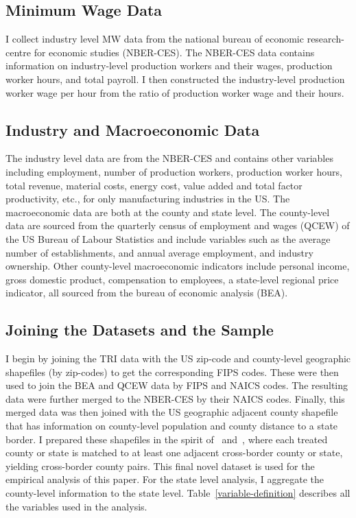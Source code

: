 \documentclass[12pt, english]{article}
\begin{document}
    \subsection{Minimum Wage Data}\label{subsec:minimum-wage-data}
    I collect industry level MW data from the national bureau of economic research-centre for economic studies (NBER-CES). The NBER-CES data contains information on industry-level production workers and their wages, production worker hours, and total payroll. I then constructed the industry-level production worker wage per hour from the ratio of production worker wage and their hours.

    \subsection{Industry and Macroeconomic Data}\label{subsec:industry-and-macroeconomic-data}
    The industry level data are from the NBER-CES and contains other variables including employment, number of production workers, production worker hours, total revenue, material costs, energy cost, value added and total factor productivity, etc., for only manufacturing industries in the US. The macroeconomic data are both at the county and state level. The county-level data are sourced from the quarterly census of employment and wages (QCEW) of the US Bureau of Labour Statistics and include variables such as the average number of establishments, and annual average employment, and industry ownership. Other county-level macroeconomic indicators include personal income, gross domestic product, compensation to employees, a state-level regional price indicator, all sourced from the bureau of economic analysis (BEA).

    \subsection{Joining the Datasets and the Sample}\label{subsec:joining-the-datasets-and-the-sample}
    I begin by joining the TRI data with the US zip-code and county-level geographic shapefiles (by zip-codes) to get the corresponding FIPS codes. These were then used to join the BEA and QCEW data by FIPS and NAICS codes. The resulting data were further merged to the NBER-CES by their NAICS codes. Finally, this merged data was then joined with the US geographic adjacent county shapefile that has information on county-level population and county distance to a state border. I prepared these shapefiles in the spirit of~\cite{dube2010minimum} and~\cite{gopalan2021state}, where each treated county or state is matched to at least one adjacent cross-border county or state, yielding cross-border county pairs. This final novel dataset is used for the empirical analysis of this paper. For the state level analysis, I aggregate the county-level information to the state level. Table~\ref{variable-definition} describes all the variables used in the analysis.
\end{document}
